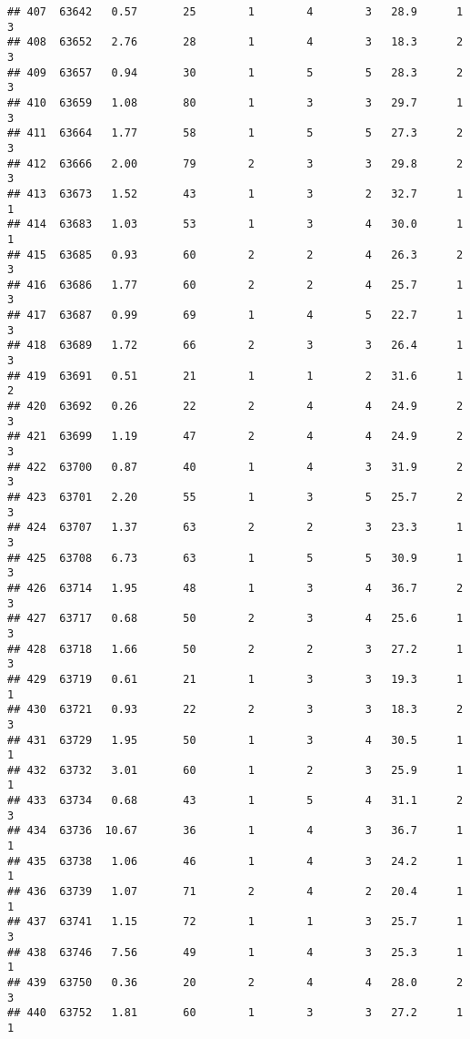 \documentclass[
]{article}
\begin{document}
\begin{verbatim}
## 407  63642   0.57       25        1        4        3   28.9      1      3
## 408  63652   2.76       28        1        4        3   18.3      2      3
## 409  63657   0.94       30        1        5        5   28.3      2      3
## 410  63659   1.08       80        1        3        3   29.7      1      3
## 411  63664   1.77       58        1        5        5   27.3      2      3
## 412  63666   2.00       79        2        3        3   29.8      2      3
## 413  63673   1.52       43        1        3        2   32.7      1      1
## 414  63683   1.03       53        1        3        4   30.0      1      1
## 415  63685   0.93       60        2        2        4   26.3      2      3
## 416  63686   1.77       60        2        2        4   25.7      1      3
## 417  63687   0.99       69        1        4        5   22.7      1      3
## 418  63689   1.72       66        2        3        3   26.4      1      3
## 419  63691   0.51       21        1        1        2   31.6      1      2
## 420  63692   0.26       22        2        4        4   24.9      2      3
## 421  63699   1.19       47        2        4        4   24.9      2      3
## 422  63700   0.87       40        1        4        3   31.9      2      3
## 423  63701   2.20       55        1        3        5   25.7      2      3
## 424  63707   1.37       63        2        2        3   23.3      1      3
## 425  63708   6.73       63        1        5        5   30.9      1      3
## 426  63714   1.95       48        1        3        4   36.7      2      3
## 427  63717   0.68       50        2        3        4   25.6      1      3
## 428  63718   1.66       50        2        2        3   27.2      1      3
## 429  63719   0.61       21        1        3        3   19.3      1      1
## 430  63721   0.93       22        2        3        3   18.3      2      3
## 431  63729   1.95       50        1        3        4   30.5      1      1
## 432  63732   3.01       60        1        2        3   25.9      1      1
## 433  63734   0.68       43        1        5        4   31.1      2      3
## 434  63736  10.67       36        1        4        3   36.7      1      1
## 435  63738   1.06       46        1        4        3   24.2      1      1
## 436  63739   1.07       71        2        4        2   20.4      1      1
## 437  63741   1.15       72        1        1        3   25.7      1      3
## 438  63746   7.56       49        1        4        3   25.3      1      1
## 439  63750   0.36       20        2        4        4   28.0      2      3
## 440  63752   1.81       60        1        3        3   27.2      1      1

\end{verbatim}
\end{document}
